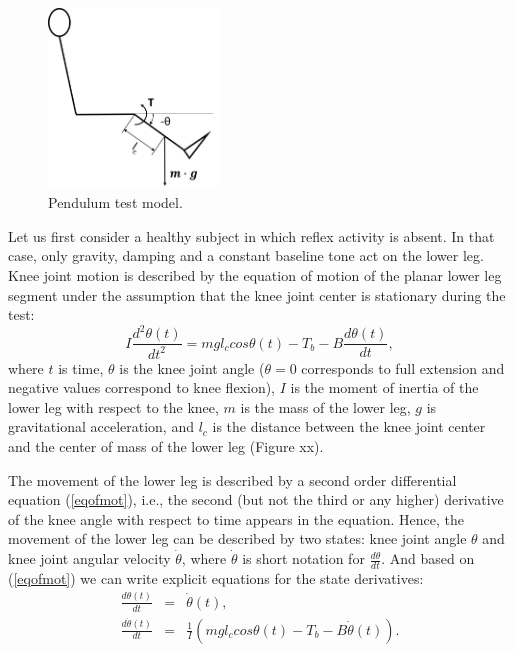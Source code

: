 \documentclass[
a4paper, %
11pt, %
onecolumn, %
openright, %
]{memoir}
\begin{document}
\begin{figure}
  \begin{center}
    \includegraphics[width=0.4\textwidth]{Figure1.jpg}
  \end{center}
  \caption{Pendulum test model.}
  \label{Fig:model}
\end{figure}

Let us first consider a healthy subject in which reflex activity is absent. In that case, only gravity, damping and a constant baseline tone act on the lower leg. Knee joint motion is described by the equation of motion of the planar lower leg segment under the assumption that the knee joint center is stationary during the test:
\begin{equation}
I \frac{d^2\theta(t)}{dt^2} = m g l_c cos\theta(t) - T_b - B \frac{d\theta(t)}{dt},
\label{eqofmot}
\end{equation}
where $t$ is time, $\theta$ is the knee joint angle ($\theta = 0$ corresponds to full extension and negative values correspond to knee flexion), $I$ is the moment of inertia of the lower leg with respect to the knee, $m$ is the mass of the lower leg, $g$ is gravitational acceleration, and $l_c$ is the distance between the knee joint center and the center of mass of the lower leg (Figure xx). 

The movement of the lower leg is described by a second order differential equation (\ref{eqofmot}), i.e., the second (but not the third or any higher) derivative of the knee angle with respect to time appears in the equation. Hence, the movement of the lower leg can be described by two states: knee joint angle $\theta$ and knee joint angular velocity $\dot{\theta}$, where $\dot{\theta}$ is short notation for $\frac{d\theta}{dt}$. And based on (\ref{eqofmot}) we can write explicit equations for the state derivatives:
\begin{eqnarray}
\frac{d\theta(t)}{dt} & = & \dot{\theta}(t), \label{eqofmot1}\\
\frac{d \dot{\theta}(t)}{dt} & = &\frac{1}{I} \left( m g l_c cos\theta(t) - T_b - B \dot{\theta}(t) \right).
\label{eqofmot2}
\end{eqnarray}
\end{document}
